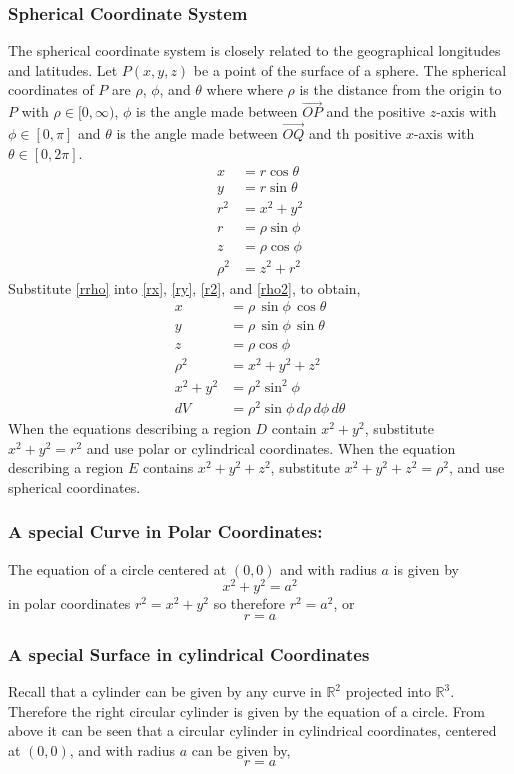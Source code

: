 \documentclass[14pt]{article}
\begin{document}
    \subsubsection{Spherical Coordinate System} 
    The spherical coordinate system is closely related to the
    geographical longitudes and latitudes. Let $P(x,y,z)$ be a point of
    the surface of a sphere. The spherical coordinates of $P$ are
    $\rho$, $\phi$, and $\theta$ where where $\rho$ is the distance from
    the origin to $P$ with $\rho\in[0,\infty)$, $\phi$ is the angle made
    between $\vec {OP}$ and the positive $z$-axis with $\phi\in[0, \pi]$
    and $\theta$ is the angle made between $\vec{OQ}$ and th positive
    $x$-axis with $\theta\in[0,2\pi]$.
    \begin{align}
        x&=r\cos\theta\label{rx}\\
        y&=r\sin\theta\label{ry}\\
        r^2&=x^2+y^2\label{r2}\\
        r&=\rho\sin\phi\label{rrho}\\
        z&=\rho\cos\phi\label{zrho}\\
        \rho^2&=z^2+r^2\label{rho2}
    \end{align}
    Substitute \eqref{rrho} into \eqref{rx}, \eqref{ry}, \eqref{r2}, and
    \eqref{rho2}, to obtain,
    \begin{align*}
        x&=\rho\,\sin\phi\,\cos\theta\\
        y&=\rho\,\sin\phi\,\sin\theta\\
        z&=\rho\cos\phi\\
        \rho^2&=x^2+y^2+z^2\\
        x^2+y^2&=\rho^2\sin^2\phi\\
        dV&=\rho^2\sin\phi\,d\rho\, d\phi\, d\theta
    \end{align*}
    When the equations describing a region $D$ contain $x^2+y^2$,
    substitute $x^2+y^2=r^2$ and use polar or cylindrical coordinates.
    When the equation describing a region $E$ contains $x^2+y^2+z^2$,
    substitute $x^2+y^2+z^2=\rho^2$, and use spherical coordinates.
    \subsubsection{A special Curve in Polar Coordinates:}
    The equation of a circle centered at $(0,0)$ and with radius $a$ is
    given by 
    $$x^2+y^2=a^2$$ in polar coordinates $r^2=x^2+y^2$ so therefore
    $r^2=a^2$, or
    $$r=a$$
    \subsubsection{A special Surface in cylindrical Coordinates}
    Recall that a cylinder can be given by any curve in $\mathbb{R}^2$
    projected into $\mathbb{R}^3$. Therefore the right circular cylinder
    is given by the equation of a circle. From above it can be seen that
    a circular cylinder in cylindrical coordinates, centered at $(0,0)$,
    and with radius $a$ can be given by,
    $$r=a$$
\end{document}
